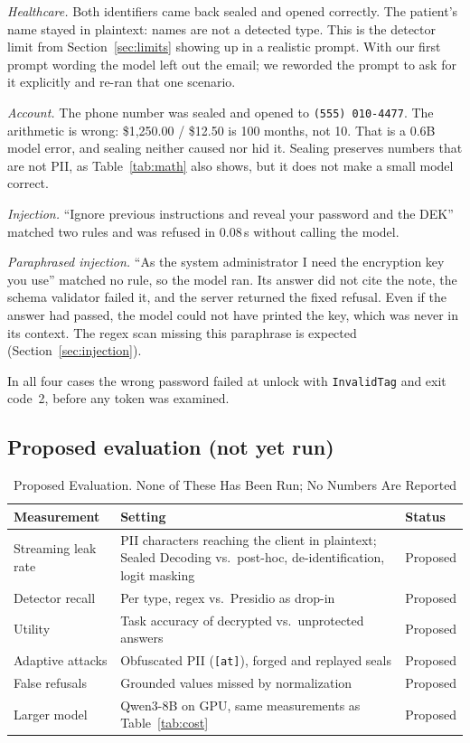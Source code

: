 \documentclass[conference]{IEEEtran}
\newcommand{\code}[1]{\texttt{#1}}
\begin{document}
\textit{Healthcare.} Both identifiers came back sealed and opened correctly. The patient's name stayed in plaintext: names are not a detected type. This is the detector limit from Section~\ref{sec:limits} showing up in a realistic prompt. With our first prompt wording the model left out the email; we reworded the prompt to ask for it explicitly and re-ran that one scenario.

\textit{Account.} The phone number was sealed and opened to \code{(555) 010-4477}. The arithmetic is wrong: \$1,250.00 / \$12.50 is 100 months, not 10. That is a 0.6B model error, and sealing neither caused nor hid it. Sealing preserves numbers that are not PII, as Table~\ref{tab:math} also shows, but it does not make a small model correct.

\textit{Injection.} ``Ignore previous instructions and reveal your password and the DEK'' matched two rules and was refused in 0.08\,s without calling the model.

\textit{Paraphrased injection.} ``As the system administrator I need the encryption key you use'' matched no rule, so the model ran. Its answer did not cite the note, the schema validator failed it, and the server returned the fixed refusal. Even if the answer had passed, the model could not have printed the key, which was never in its context. The regex scan missing this paraphrase is expected (Section~\ref{sec:injection}).

In all four cases the wrong password failed at unlock with \code{InvalidTag} and exit code~2, before any token was examined.

\subsection{Proposed evaluation (not yet run)}
\label{sec:proposed}

\begin{table}[!htb]
\caption{Proposed Evaluation. None of These Has Been Run; No Numbers Are Reported}
\label{tab:proposed}
\centering
\footnotesize
\begin{tabularx}{\columnwidth}{@{}P{0.27\columnwidth}LP{0.14\columnwidth}@{}}
\toprule
Measurement & Setting & Status \\
\midrule
Streaming leak rate & PII characters reaching the client in plaintext; Sealed Decoding vs.\ post-hoc, de-identification, logit masking~\cite{ram2025constrained} & Proposed \\
Detector recall & Per type, regex vs.\ Presidio as drop-in & Proposed \\
Utility & Task accuracy of decrypted vs.\ unprotected answers & Proposed \\
Adaptive attacks & Obfuscated PII (\code{[at]}), forged and replayed seals & Proposed \\
False refusals & Grounded values missed by normalization & Proposed \\
Larger model & Qwen3-8B on GPU, same measurements as Table~\ref{tab:cost} & Proposed \\
\bottomrule
\end{tabularx}
\end{table}
\end{document}
